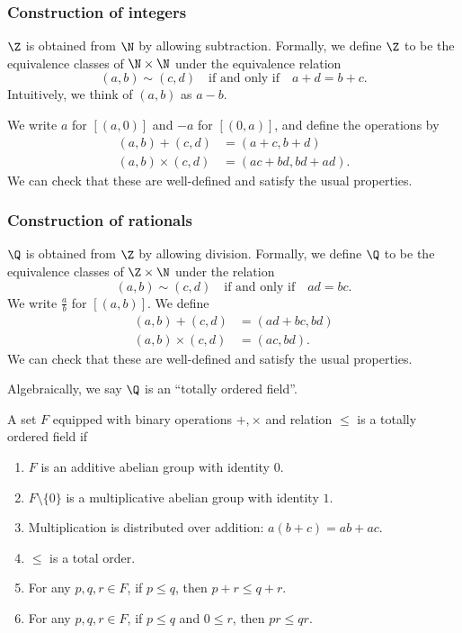 \documentclass[a4paper]{article}
\begin{document}
\subsubsection*{Construction of integers}
\begin{defi}[Integers]
  $\Z$ is obtained from $\N$ by allowing subtraction. Formally, we define $\Z$ to be the equivalence classes of $\N\times \N$ under the equivalence relation
  \[
    (a, b) \sim (c, d) \quad\text{if and only if}\quad a + d = b + c.
  \]
  Intuitively, we think of $(a, b)$ as $a - b$.

  We write $a$ for $[(a, 0)]$ and $-a$ for $[(0, a)]$, and define the operations by
  \begin{align*}
    (a, b) + (c, d) &= (a + c, b + d)\\
    (a, b)\times (c, d) &= (ac + bd, bd + ad).
  \end{align*}
  We can check that these are well-defined and satisfy the usual properties.
\end{defi}

\subsubsection*{Construction of rationals}
\begin{defi}[Rationals]
  $\Q$ is obtained from $\Z$ by allowing division. Formally, we define $\Q$ to be the equivalence classes of $\Z \times \N$ under the relation
  \[
    (a, b) \sim (c, d)\quad\text{if and only if}\quad ad = bc.
  \]
  We write $\frac{a}{b}$ for $[(a, b)]$. We define
  \begin{align*}
   (a, b) + (c, d) &= (ad + bc, bd)\\
   (a, b)\times (c, d) &= (ac, bd).
  \end{align*}
  We can check that these are well-defined and satisfy the usual properties.
\end{defi}

Algebraically, we say $\Q$ is an ``totally ordered field''.
\begin{defi}
  A set $F$ equipped with binary operations $+, \times$ and relation $\leq$ is a totally ordered field if
  \begin{enumerate}
    \item $F$ is an additive abelian group with identity $0$.
    \item $F\setminus \{0\}$ is a multiplicative abelian group with identity $1$.
    \item Multiplication is distributed over addition: $a(b + c) = ab + ac$.
    \item $\leq$ is a total order.
    \item For any $p, q, r \in F$, if $p \leq q$, then $p + r \leq q+ r$.
    \item For any $p, q, r \in F$, if $p \leq q$ and $0 \leq r$, then $p r \leq qr$.
  \end{enumerate}
\end{defi}
\end{document}
